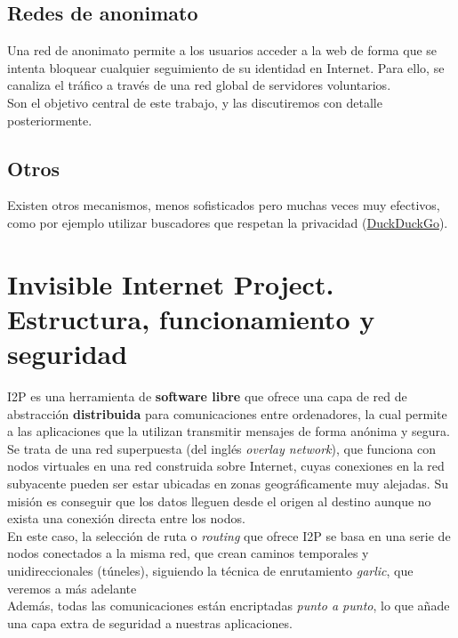 \subsection{Redes de anonimato} 

Una red de anonimato permite a los usuarios acceder a la web de forma que se intenta bloquear cualquier seguimiento de su identidad en Internet. Para ello, se canaliza el tráfico a través de una red global de servidores voluntarios.\\

Son el objetivo central de este trabajo, y las discutiremos con detalle posteriormente.

\subsection{Otros} Existen otros mecanismos, menos sofisticados pero muchas veces muy efectivos, como por ejemplo utilizar buscadores que respetan la privacidad (\href{https://duckduckgo.com/}{\url{DuckDuckGo}}).




    \section{Invisible Internet Project. Estructura, funcionamiento y seguridad}

I2P es una herramienta de \textbf{software libre} que ofrece una capa de red de abstracción  \textbf{distribuida} para comunicaciones entre ordenadores, la cual permite a las aplicaciones que la utilizan transmitir mensajes de forma anónima y segura. Se trata de una red superpuesta (del inglés \textit{overlay network}), que funciona con nodos virtuales en una red construida sobre Internet, cuyas conexiones en la red subyacente pueden ser estar ubicadas en zonas geográficamente muy alejadas. Su misión es conseguir que los datos lleguen desde el origen al destino aunque no exista una conexión directa entre los nodos.\\

En este caso, la selección de ruta o \textit{routing} que ofrece I2P se basa en una serie de nodos conectados a la misma red, que crean caminos temporales y unidireccionales (túneles), siguiendo la técnica de enrutamiento \textit{garlic}, que veremos a más adelante\\

Además, todas las comunicaciones están encriptadas \textit{punto a punto}, lo que añade una capa extra de seguridad a nuestras aplicaciones.

